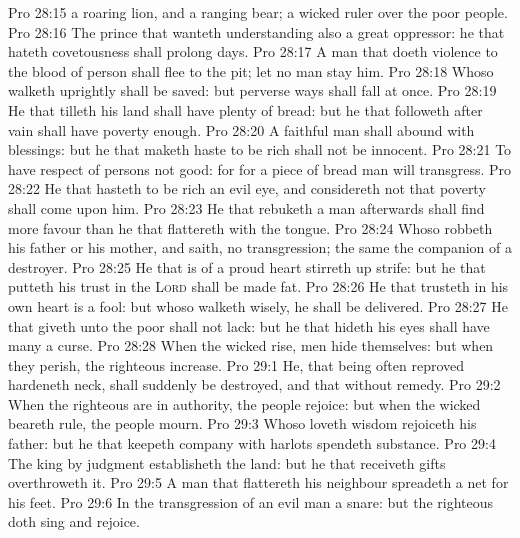 \vs Pro 28:15  a roaring lion, and a ranging bear;  a wicked ruler over the poor people.
\vs Pro 28:16 The prince that wanteth understanding  also a great oppressor:  he that hateth covetousness shall prolong  days.
\vs Pro 28:17 A man that doeth violence to the blood of  person shall flee to the pit; let no man stay him.
\vs Pro 28:18 Whoso walketh uprightly shall be saved: but  perverse  ways shall fall at once.
\vs Pro 28:19 He that tilleth his land shall have plenty of bread: but he that followeth after vain  shall have poverty enough.
\vs Pro 28:20 A faithful man shall abound with blessings: but he that maketh haste to be rich shall not be innocent.
\vs Pro 28:21 To have respect of persons  not good: for for a piece of bread  man will transgress.
\vs Pro 28:22 He that hasteth to be rich  an evil eye, and considereth not that poverty shall come upon him.
\vs Pro 28:23 He that rebuketh a man afterwards shall find more favour than he that flattereth with the tongue.
\vs Pro 28:24 Whoso robbeth his father or his mother, and saith,  no transgression; the same  the companion of a destroyer.
\vs Pro 28:25 He that is of a proud heart stirreth up strife: but he that putteth his trust in the \textsc{Lord} shall be made fat.
\vs Pro 28:26 He that trusteth in his own heart is a fool: but whoso walketh wisely, he shall be delivered.
\vs Pro 28:27 He that giveth unto the poor shall not lack: but he that hideth his eyes shall have many a curse.
\vs Pro 28:28 When the wicked rise, men hide themselves: but when they perish, the righteous increase.
\vs Pro 29:1 He, that being often reproved hardeneth  neck, shall suddenly be destroyed, and that without remedy.
\vs Pro 29:2 When the righteous are in authority, the people rejoice: but when the wicked beareth rule, the people mourn.
\vs Pro 29:3 Whoso loveth wisdom rejoiceth his father: but he that keepeth company with harlots spendeth  substance.
\vs Pro 29:4 The king by judgment establisheth the land: but he that receiveth gifts overthroweth it.
\vs Pro 29:5 A man that flattereth his neighbour spreadeth a net for his feet.
\vs Pro 29:6 In the transgression of an evil man  a snare: but the righteous doth sing and rejoice.
